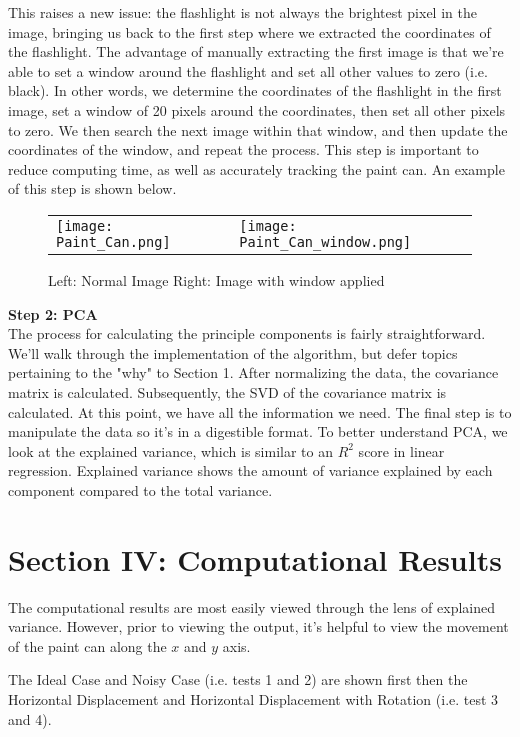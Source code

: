 \documentclass{cup-pan}
\begin{document}
\vskip 0.05in
\noindent
This raises a new issue: the flashlight is not always the brightest pixel in the image, bringing us back to the first step where we extracted the coordinates of the flashlight.  The advantage of manually extracting the first image is that we're able to set a window around the flashlight and set all other values to zero (i.e. black).  In other words, we determine the coordinates of the flashlight in the first image, set a window of 20 pixels around the coordinates, then set all other pixels to zero.  We then search the next image within that window, and then update the coordinates of the window, and repeat the process. This step is important to reduce computing time, as well as accurately tracking the paint can. An example of this step is shown below.

\begin{figure}[h]
\begin{tabular}{ll}
\texttt{[image: Paint\_Can.png]}
&
\texttt{[image: Paint\_Can\_window.png]}
\end{tabular}
\caption{Left: Normal Image \; \; \; \; \; Right: Image with window applied}
\label{Fig:Race}
\end{figure}

\vskip 0.1in
\noindent
\textbf{Step 2: PCA}\\
The process for calculating the principle components is fairly straightforward.  We'll walk through the implementation of the algorithm, but defer topics pertaining to the "why" to Section 1. 
\noindent
After normalizing the data, the covariance matrix is calculated.  Subsequently, the SVD of the covariance matrix is calculated.  At this point, we have all the information we need.  The final step is to manipulate the data so it's in a digestible format.  To better understand PCA, we look at the explained variance, which is similar to an $R^2$ score in linear regression.  Explained variance shows the amount of variance explained by each component compared to the total variance.   

\section{Section IV: Computational Results}
The computational results are most easily viewed through the lens of explained variance.  However, prior to viewing the output, it's helpful to view the movement of the paint can along the $x$ and $y$ axis.  

\noindent
The Ideal Case and Noisy Case (i.e. tests 1 and 2) are shown first then the Horizontal Displacement and Horizontal Displacement with Rotation (i.e. test 3 and 4).  
\end{document}
